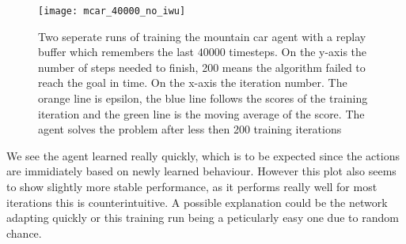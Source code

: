 \begin{figure}
    \texttt{[image: mcar\_40000\_no\_iwu]}
    \caption{Two seperate runs of training the mountain car agent with a replay buffer which remembers the last $40000$ timesteps. On the y-axis the number of steps needed to finish, 200 means the algorithm failed to reach the goal in time. On the x-axis the iteration number. The orange line is epsilon, the blue line follows the scores of the training iteration and the green line is the moving average of the score. The agent solves the problem after less then 200 training iterations}
    \label{fig:no_iwu}
\end{figure}

We see the agent learned really quickly, which is to be expected since the actions are immidiately based on newly learned behaviour. However this plot also seems to show slightly more stable performance, as it performs really well for most iterations this is counterintuitive. A possible explanation could be the network adapting quickly or this training run being a peticularly easy one due to random chance.